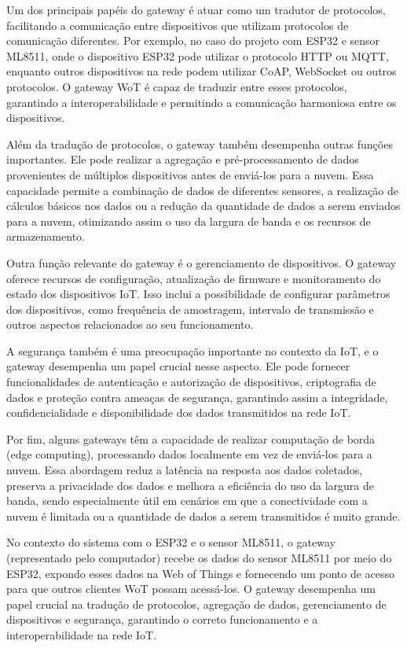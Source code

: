 Um dos principais papéis do gateway é atuar como um tradutor de protocolos, facilitando a comunicação entre dispositivos que utilizam protocolos de comunicação diferentes. Por exemplo, no caso do projeto com ESP32 e sensor ML8511, onde o dispositivo ESP32 pode utilizar o protocolo HTTP ou MQTT, enquanto outros dispositivos na rede podem utilizar CoAP, WebSocket ou outros protocolos. O gateway WoT é capaz de traduzir entre esses protocolos, garantindo a interoperabilidade e permitindo a comunicação harmoniosa entre os dispositivos.

Além da tradução de protocolos, o gateway também desempenha outras funções importantes. Ele pode realizar a agregação e pré-processamento de dados provenientes de múltiplos dispositivos antes de enviá-los para a nuvem. Essa capacidade permite a combinação de dados de diferentes sensores, a realização de cálculos básicos nos dados ou a redução da quantidade de dados a serem enviados para a nuvem, otimizando assim o uso da largura de banda e os recursos de armazenamento.

Outra função relevante do gateway é o gerenciamento de dispositivos. O gateway oferece recursos de configuração, atualização de firmware e monitoramento do estado dos dispositivos IoT. Isso inclui a possibilidade de configurar parâmetros dos dispositivos, como frequência de amostragem, intervalo de transmissão e outros aspectos relacionados ao seu funcionamento.

A segurança também é uma preocupação importante no contexto da IoT, e o gateway desempenha um papel crucial nesse aspecto. Ele pode fornecer funcionalidades de autenticação e autorização de dispositivos, criptografia de dados e proteção contra ameaças de segurança, garantindo assim a integridade, confidencialidade e disponibilidade dos dados transmitidos na rede IoT.

Por fim, alguns gateways têm a capacidade de realizar computação de borda (edge computing), processando dados localmente em vez de enviá-los para a nuvem. Essa abordagem reduz a latência na resposta aos dados coletados, preserva a privacidade dos dados e melhora a eficiência do uso da largura de banda, sendo especialmente útil em cenários em que a conectividade com a nuvem é limitada ou a quantidade de dados a serem transmitidos é muito grande.

No contexto do sistema com o ESP32 e o sensor ML8511, o gateway (representado pelo computador) recebe os dados do sensor ML8511 por meio do ESP32, expondo esses dados na Web of Things e fornecendo um ponto de acesso para que outros clientes WoT possam acessá-los. O gateway desempenha um papel crucial na tradução de protocolos, agregação de dados, gerenciamento de dispositivos e segurança, garantindo o correto funcionamento e a interoperabilidade na rede IoT.

